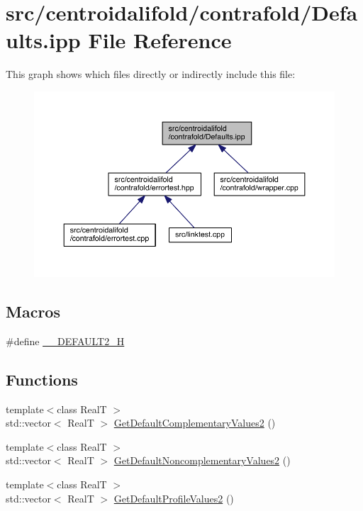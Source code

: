 \hypertarget{centroidalifold_2contrafold_2_defaults_8ipp}{\section{src/centroidalifold/contrafold/\+Defaults.ipp File Reference}
\label{centroidalifold_2contrafold_2_defaults_8ipp}
}
This graph shows which files directly or indirectly include this file\+:
\nopagebreak
\begin{figure}[H]
\begin{center}
\leavevmode
\includegraphics[width=350pt]{centroidalifold_2contrafold_2_defaults_8ipp__dep__incl}
\end{center}
\end{figure}
\subsection*{Macros}
\begin{DoxyCompactItemize}
\item 
\#define \hyperlink{centroidalifold_2contrafold_2_defaults_8ipp_ae1b5e9a8d9505ec78a6bd3aed891729b}{\+\_\+\+\_\+\+D\+E\+F\+A\+U\+L\+T2\+\_\+\+H}
\end{DoxyCompactItemize}
\subsection*{Functions}
\begin{DoxyCompactItemize}
\item 
{\footnotesize template$<$class Real\+T $>$ }\\std\+::vector$<$ Real\+T $>$ \hyperlink{centroidalifold_2contrafold_2_defaults_8ipp_a2c8016e6f9625e1f1c1830029689a09e}{Get\+Default\+Complementary\+Values2} ()
\item 
{\footnotesize template$<$class Real\+T $>$ }\\std\+::vector$<$ Real\+T $>$ \hyperlink{centroidalifold_2contrafold_2_defaults_8ipp_acf310f3f13840d51bad1fa5855487e8e}{Get\+Default\+Noncomplementary\+Values2} ()
\item 
{\footnotesize template$<$class Real\+T $>$ }\\std\+::vector$<$ Real\+T $>$ \hyperlink{centroidalifold_2contrafold_2_defaults_8ipp_a09a7f108111c759a57e2a264a3777300}{Get\+Default\+Profile\+Values2} ()
\end{DoxyCompactItemize}


